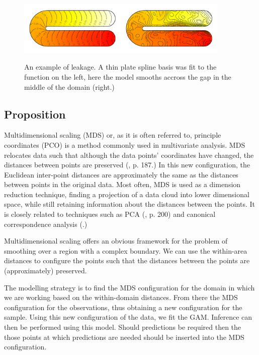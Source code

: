 \documentclass[a4paper,10pt]{article}
\begin{document}
\begin{figure}
\centering
\includegraphics[width=4in]{figs/ramsay-leak.pdf}\\
\caption{An example of leakage. A thin plate spline basis was fit to the function on the left, here the model smooths accross the gap in the middle of the domain (right.)}
\label{leakage}
\end{figure}


\subsection{Proposition}

Multidimensional scaling (MDS) or, as it is often referred to, principle coordinates (PCO) is a method commonly used in multivariate analysis. MDS relocates data such that although the data points' coordinates have changed, the distances between points are preserved (\cite{chatfieldcollins}, p. 187.) In this new configuration, the Euclidean inter-point distances are approximately the same as the distances between points in the original data. Most often, MDS is used as a dimension reduction technique, finding a projection of a data cloud into lower dimensional space, while still retaining information about the distances between the points. It is closely related to techniques such as PCA (\cite{chatfieldcollins}, p. 200) and canonical correspondence analysis (\cite{terbraak}.)

Multidimensional scaling offers an obvious framework for the problem of smoothing over a region with a complex boundary. We can use the within-area distances to configure the points such that the distances between the points are (approximately) preserved.

The modelling strategy is to find the MDS configuration for the domain in which we are working based on the within-domain distances. From there the MDS configuration for the observations, thus obtaining a new configuration for the sample. Using this new configuration of the data, we fit the GAM. Inference can then be performed using this model. Should predictions be required then the those points at which predictions are needed should be inserted into the MDS configuration.
\end{document}
